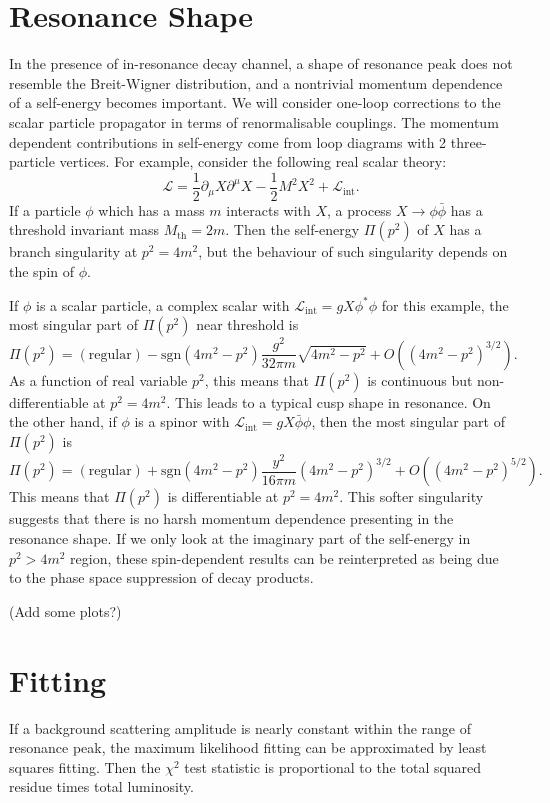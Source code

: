 \documentclass[11pt]{article}
\theoremstyle{definition}
\theoremstyle{remark}
\begin{document}
	\section{Resonance Shape}
	In the presence of in-resonance decay channel, a shape of resonance peak does not resemble the Breit-Wigner distribution, and a nontrivial momentum dependence of a self-energy becomes important.	
	We will consider one-loop corrections to the scalar particle propagator in terms of renormalisable couplings.
	The momentum dependent contributions in self-energy come from loop diagrams with 2 three-particle vertices.
	For example, consider the following real scalar theory:
	\[\mathcal{L}=\frac{1}{2}\partial_{\mu}X\partial^{\mu}X-\frac{1}{2}M^{2}X^{2}+\mathcal{L}_{\mathrm{int}}.\]
	If a particle $\phi$ which has a mass $m$ interacts with $X$, a process $X\to\phi\bar{\phi}$ has a threshold invariant mass $M_{\mathrm{th}}=2m$.
	Then the self-energy $\Pi(p^{2})$ of $X$ has a branch singularity at $p^{2}=4m^{2}$, but the behaviour of such singularity depends on the spin of $\phi$.
	
	If $\phi$ is a scalar particle, a complex scalar with $\mathcal{L}_{\mathrm{int}}=gX\phi^{\ast}\phi$ for this example, the most singular part of $\Pi(p^{2})$ near threshold is
	\[\Pi(p^{2})=(\mathrm{regular})-\mathrm{sgn}(4m^{2}-p^{2})\frac{g^{2}}{32\pi m}\sqrt{4m^{2}-p^{2}}+O((4m^{2}-p^{2})^{3/2}).\]
	As a function of real variable $p^{2}$, this means that $\Pi(p^{2})$ is continuous but non-differentiable at $p^{2}=4m^{2}$.
	This leads to a typical cusp shape in resonance.
	On the other hand, if $\phi$ is a spinor with $\mathcal{L}_{\mathrm{int}}=gX\bar{\phi}\phi$, then the most singular part of $\Pi(p^{2})$ is
	\[\Pi(p^{2})=(\mathrm{regular})+\mathrm{sgn}(4m^{2}-p^{2})\frac{y^{2}}{16\pi m}(4m^{2}-p^{2})^{3/2}+O((4m^{2}-p^{2})^{5/2}).\]
	This means that $\Pi(p^{2})$ is differentiable at $p^{2}=4m^{2}$.
	This softer singularity suggests that there is no harsh momentum dependence presenting in the resonance shape.
	If we only look at the imaginary part of the self-energy in $p^{2}>4m^{2}$ region, these spin-dependent results can be reinterpreted as being due to the phase space suppression of decay products.
	
	(Add some plots?)
	
	\section{Fitting}
	If a background scattering amplitude is nearly constant within the range of resonance peak, the maximum likelihood fitting can be approximated by least squares fitting.
	Then the $\chi^{2}$ test statistic is proportional to the total squared residue times total luminosity.
	
\end{document}

